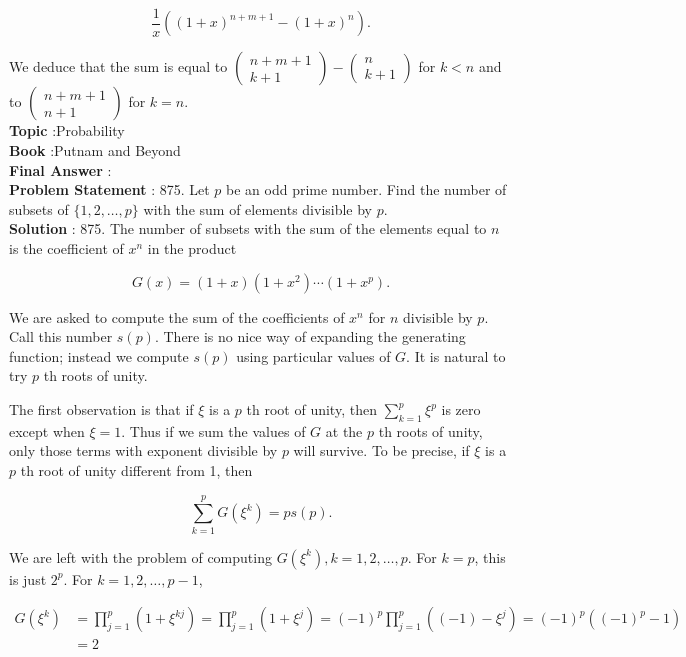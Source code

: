 \documentclass[10pt]{article}
\begin{document}
$$
\frac{1}{x}\left((1+x)^{n+m+1}-(1+x)^{n}\right) .
$$

We deduce that the sum is equal to $\left(\begin{array}{c}n+m+1 \\ k+1\end{array}\right)-\left(\begin{array}{c}n \\ k+1\end{array}\right)$ for $k<n$ and to $\left(\begin{array}{c}n+m+1 \\ n+1\end{array}\right)$ for $k=n$. 
\\
\textbf{Topic} :Probability\\
\textbf{Book} :Putnam and Beyond\\
\textbf{Final Answer} :\\


\textbf{Problem Statement} :
875. Let $p$ be an odd prime number. Find the number of subsets of $\{1,2, \ldots, p\}$ with the sum of elements divisible by $p$.
\\
\textbf{Solution} :
875. The number of subsets with the sum of the elements equal to $n$ is the coefficient of $x^{n}$ in the product

$$
G(x)=(1+x)\left(1+x^{2}\right) \cdots\left(1+x^{p}\right) .
$$

We are asked to compute the sum of the coefficients of $x^{n}$ for $n$ divisible by $p$. Call this number $s(p)$. There is no nice way of expanding the generating function; instead we compute $s(p)$ using particular values of $G$. It is natural to try $p$ th roots of unity.

The first observation is that if $\xi$ is a $p$ th root of unity, then $\sum_{k=1}^{p} \xi^{p}$ is zero except when $\xi=1$. Thus if we sum the values of $G$ at the $p$ th roots of unity, only those terms with exponent divisible by $p$ will survive. To be precise, if $\xi$ is a $p$ th root of unity different from 1, then

$$
\sum_{k=1}^{p} G\left(\xi^{k}\right)=p s(p) .
$$

We are left with the problem of computing $G\left(\xi^{k}\right), k=1,2, \ldots, p$. For $k=p$, this is just $2^{p}$. For $k=1,2, \ldots, p-1$,

$$
\begin{aligned}
G\left(\xi^{k}\right) &=\prod_{j=1}^{p}\left(1+\xi^{k j}\right)=\prod_{j=1}^{p}\left(1+\xi^{j}\right)=(-1)^{p} \prod_{j=1}^{p}\left((-1)-\xi^{j}\right)=(-1)^{p}\left((-1)^{p}-1\right) \\
&=2
\end{aligned}
$$
\end{document}
